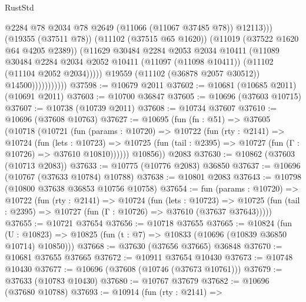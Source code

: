 \begin{lexlean}{RustStd}
\begin{coremodule}
                                  @2284
                                  @78
                                  @2034
                                  @78
                                  @2649
                                  (@11066 (@11067 @37485 @78))
                                  @12113)))
                            (@19355 (@37511 @78))
                            (@11102 (@37515 @65 @1620))
                            (@11019 (@37522 @1620 @64 @4205 @2389))
                            (@11629
                              @30484
                              @2284
                              @2053
                              @2034
                              @10411
                              (@11089
                                @30484
                                @2284
                                @2034
                                @2052
                                @10411
                                (@11097 (@11098 @10411))
                                (@11102 (@11104 @2052 @2034)))))
                          @19559
                          (@11102 (@36878 @2057 @30512))
                          @14500)))))))))))
@37598 := @10679 @2011
@37602 := @10681 (@10685 @2011) (@10691 @2011)
@37603 := @10700 @36847
@37605 := @10696 (@37603 @10715)
@37607 := @10738 (@10739 @2011)
@37608 := @10734 @37607
@37610 := @10696 (@37608 @10763)
@37627 := @10695
    (fun (fn : @51) =>
    @37605
      (@10718
        (@10721
          (fun (params : @10720) =>
          @10722
            (fun (rty : @2141) =>
            @10724
              (fun (lets : @10723) =>
              @10725 (fun (tail : @2395) => @10727 (fun (Γ : @10726) => @37610 @10810))))))
        @10856))
    @2083
@37630 := @10862 (@37603 (@10713 @2083))
@37633 := @10775 (@10776 @2083) @36850
@37637 := @10696 (@10767 (@37633 @10784) @10788)
@37638 := @10801 @2083
@37643 := @10798 (@10800 @37638 @36853 @10756 @10758)
@37654 := fun (params : @10720) =>
  @10722
    (fun (rty : @2141) =>
    @10724
      (fun (lets : @10723) =>
      @10725 (fun (tail : @2395) => @10727 (fun (Γ : @10726) => @37610 (@37637 @37643)))))
@37655 := @10721 @37654
@37656 := @10718 @37655
@37665 := @10824
    (fun (U : @10823) => @10825 (fun (t : @7) => @10833 (@10696 (@10839 @36850 @10714) @10850)))
@37668 := @37630 (@37656 @37665) @36848
@37670 := @10681 @37655 @37665
@37672 := @10911 @37654 @10430
@37673 := @10748 @10430
@37677 := @10696 (@37608 (@10746 (@37673 @10761)))
@37679 := @37633 (@10783 @10430)
@37680 := @10767 @37679
@37682 := @10696 (@37680 @10788)
@37693 := @10914
    (fun (rty : @2141) =>

\end{coremodule}
\end{lexlean}
